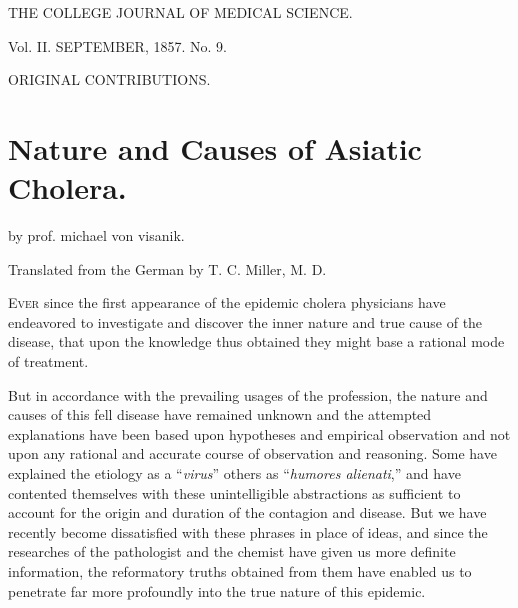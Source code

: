 THE
COLLEGE JOURNAL
OF MEDICAL SCIENCE.

Vol. II.
SEPTEMBER, 1857.
No. 9.

ORIGINAL CONTRIBUTIONS.

\chapter[Nature and Causes of Asiatic Cholera][Nature and Causes of Asiatic Cholera.]{Nature and Causes of Asiatic Cholera.}

by prof. michael von visanik.

Translated from the German by T. C. Miller, M. D.

\textsc{Ever} since the first appearance of the epidemic cholera physicians
have endeavored to investigate and discover the inner nature and true
cause of the disease, that upon the knowledge thus obtained they might
base a rational mode of treatment.

But in accordance with the prevailing usages of the profession, the
nature and causes of this fell disease have remained unknown and the
attempted explanations have been based upon hypotheses and empirical
observation and not upon any rational and accurate course of
observation and reasoning. Some have explained the etiology as
a ``\textit{virus}'' others as ``\textit{humores alienati},'' and have contented themselves
with these unintelligible abstractions as sufficient to account for
the origin and duration of the contagion and disease. But we have
recently become dissatisfied with these phrases in place of ideas, and
since the researches of the pathologist and the chemist have given us
more definite information, the reformatory truths obtained from them
have enabled us to penetrate far more profoundly into the true nature
of this epidemic.

